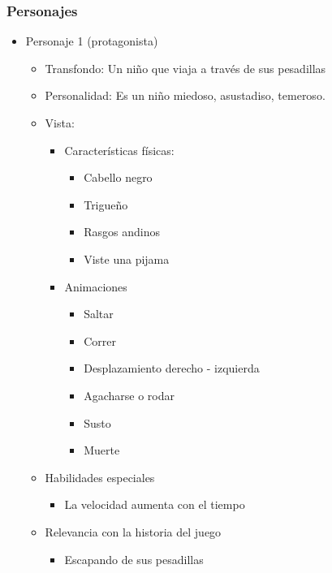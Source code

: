 \subsubsection{Personajes}
\begin{itemize}
	\item Personaje 1 (protagonista)
	      \begin{itemize}
		      \item Transfondo: Un niño que viaja a través de sus pesadillas
		      \item Personalidad: Es un niño miedoso, asustadiso, temeroso.
		      \item Vista:
		            \begin{itemize}
			            \item Características físicas:
			                  \begin{itemize}
				                  \item Cabello negro
				                  \item Trigueño
				                  \item Rasgos andinos
				                  \item Viste una pijama
			                  \end{itemize}
			            \item Animaciones
			                  \begin{itemize}
				                  \item Saltar
				                  \item Correr
				                  \item Desplazamiento derecho - izquierda
				                  \item Agacharse o rodar
				                  \item Susto
				                  \item Muerte
			                  \end{itemize}
		            \end{itemize}
		      \item Habilidades especiales
		            \begin{itemize}
			            \item La velocidad aumenta con el tiempo
		            \end{itemize}
		      \item Relevancia con la historia del juego
		            \begin{itemize}
			            \item Escapando de sus pesadillas

\end{itemize}
\end{itemize}
\end{itemize}
